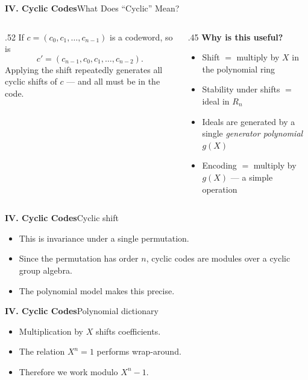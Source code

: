 \begin{frame}{\textbf{IV. Cyclic Codes}}{What Does ``Cyclic'' Mean?}
\begin{columns}[T,onlytextwidth]
\begin{column}{.52\textwidth}
    \medskip
    If $c = (c_0, c_1, \ldots, c_{n-1})$ is a codeword, so is
    \[
      c' = (c_{n-1}, c_0, c_1, \ldots, c_{n-2}).
    \]
    Applying the shift repeatedly generates all cyclic shifts of $c$ — and all must be in the code.
  \end{column}
  \begin{column}{.45\textwidth}
    \textcolor{TealDarkCyan}{\textbf{Why is this useful?}}
    \begin{itemize}
      \item Shift $=$ multiply by $X$ in the polynomial ring
      \item Stability under shifts $=$ ideal in $R_n$
      \item Ideals are generated by a single \emph{generator polynomial} $g(X)$
      \item Encoding $=$ multiply by $g(X)$ — a simple operation
    \end{itemize}

    \bigskip
  \end{column}
\end{columns}
\end{frame}

\begin{frame}{\textbf{IV. Cyclic Codes}}{Cyclic shift}
\small
{}
\begin{itemize}
  \item This is invariance under a single permutation.
  \item Since the permutation has order $n$, cyclic codes are modules over a cyclic group algebra.
  \item The polynomial model makes this precise.
\end{itemize}
\end{frame}

\begin{frame}{\textbf{IV. Cyclic Codes}}{Polynomial dictionary}
\small
{}
\begin{itemize}
  \item Multiplication by $X$ shifts coefficients.
  \item The relation $X^n=1$ performs wrap-around.
  \item Therefore we work modulo $X^n-1$.
\end{itemize}
\end{frame}

